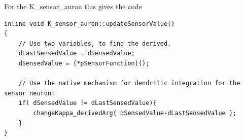 	For the K\_sensor\_auron this gives the code
\begin{lstlisting}
inline void K_sensor_auron::updateSensorValue()
{ 
	// Use two variables, to find the derived.
	dLastSensedValue = dSensedValue;
	dSensedValue = (*pSensorFunction)(); 

	// Use the native mechanism for dendritic integration for the sensor neuron:
	if( dSensedValue != dLastSensedValue){
		changeKappa_derivedArg( dSensedValue-dLastSensedValue );
	}
}
\end{lstlisting}










